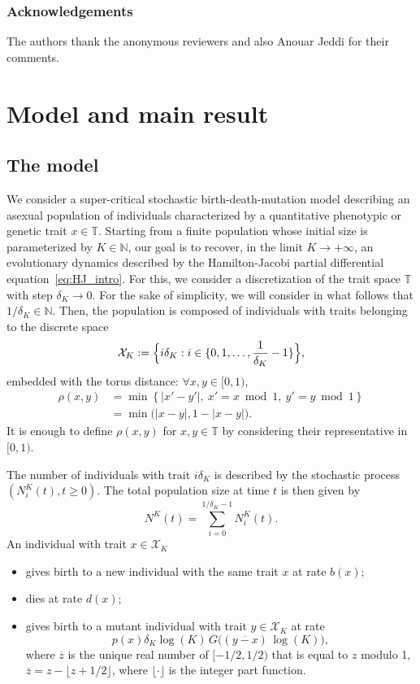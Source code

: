 \documentclass[JEP,XML,SOM,Unicode,published]{cedram}
\let\cal\mathcal
\theoremstyle{plain}
\theoremstyle{remark}
\newcommand\T{\mathbb{T}}
\newcommand\N{\mathbb{N}}
\begin{document}
\subsubsection*{Acknowledgements}
The authors thank the anonymous reviewers and also Anouar Jeddi for their comments.

\section{Model and main result}
\label{sec:model-main-result}
\subsection{The model}

We consider a super-critical stochastic birth-death-mutation model describing an asexual population of individuals characterized by a quantitative phenotypic or genetic trait $x\in \T$. Starting from a finite population whose initial size is parameterized by $K\in \N$, our goal is to recover, in the limit $K\to +\infty$, an evolutionary dynamics described by the Hamilton-Jacobi partial differential equation~\eqref{eq:HJ_intro}. For this, we consider a discretization of the trait space $\T$ with step $\delta_K\to 0$. For the sake of simplicity, we will consider in what follows that $1/\delta_K\in \N$. Then, the population is composed of individuals with traits belonging to the discrete space
\[
{\cal X}_K:=\Bigl\{i\delta_K:i\in \{0, 1,\dots, \frac{1}{\delta_K}-1\}\Bigr\},
\]
embedded with the torus distance: $\forall x, y \in [0,1)$,
\begin{align*}
\rho(x,y) & =\min\left\{|x'-y'|,\ x'=x\bmod1,\ y'=y\bmod1\right\} \\ & =\min\big(|x-y|,1-|x-y|\big).\end{align*}
It is enough to define $\rho(x,y)$ for $x,y \in \T$ by considering their representative in $[0,1)$.

The number of individuals with trait $i \delta_K$ is described by the stochastic process $(N_i^K(t), t\ge 0)$. The total population size at time $t$ is then given by
\[
N^K(t)=\sum_{i=0}^{1/\delta_K-1}N_i^K(t).
\]
An individual with trait $x\in {\cal X}_K$
\begin{itemize}
\item gives birth to a new individual with the same trait $x$ at rate $b(x)$;

\item dies at rate $d(x)$;

\item gives birth to a mutant individual with trait $y\in{\cal X}_K$ at rate
\begin{equation}\label{mutation-rate}
p(x)\delta_K \log(K)\, G\bigl((\overline{y-x})\,\log(K)\bigr),
\end{equation}
where
$\overline{z}$ is the unique real number of $[-1/2,1/2)$ that is equal to $z$ modulo 1, \ie $\overline{z}=z-\lfloor z+1/2\rfloor$, where $\lfloor\cdot\rfloor$ is the integer part function.
\end{itemize}
\end{document}
